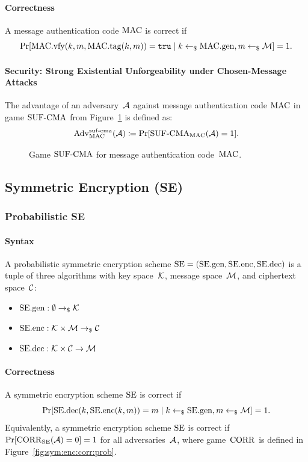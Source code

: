 \documentclass[a4paper,orivec]{llncs}
\begin{document}
\paragraph{Correctness}
A message authentication code $\mathrm{MAC}$ is correct if
\[
\Pr[\mathrm{MAC}.\mathrm{vfy}(k,m,\mathrm{MAC}.\mathrm{tag}(k,m))=\mathtt{tru}\mid k\gets_\$\mathrm{MAC}.\mathrm{gen},m\gets_\$\mathcal{M}]=1\text{.}
\]

\paragraph{Security: Strong Existential Unforgeability under Chosen-Message Attacks}
The advantage of an adversary~$\mathcal{A}$ against message authentication code $\mathrm{MAC}$ in game ${\mathrm{SUF}\text{-}\mathrm{CMA}}$ from Figure~\ref{fig:mac:suf} is defined as:
\[
\mathrm{Adv}_{\mathrm{MAC}}^{\mathrm{suf}\text{-}\mathrm{cma}}(\mathcal{A})\coloneqq\Pr[{\mathrm{SUF}\text{-}\mathrm{CMA}}_{\mathrm{MAC}}(\mathcal{A})=1]\text{.}
\]

\begin{figure}[!ht]
    \centering
    \nicoresetlinenr%
    \fbox{%
        \scalebox{\codescalefactor}{%
        }%
    }
    \caption{%
        Game ${\mathrm{SUF}\text{-}\mathrm{CMA}}$ for message authentication code~$\mathrm{MAC}$.
    }
    \label{fig:mac:suf}
\end{figure}


\subsection{Symmetric Encryption (SE)}

\subsubsection{Probabilistic SE}

\paragraph{Syntax}
A probabilistic symmetric encryption scheme $\mathrm{SE}=(\mathrm{SE}.\mathrm{gen},\mathrm{SE}.\mathrm{enc},\mathrm{SE}.\mathrm{dec})$ is a tuple of three algorithms with key space~$\mathcal{K}$, message space~$\mathcal{M}$, and ciphertext space~$\mathcal{C}$:

\begin{itemize}
    \item $\mathrm{SE}.\mathrm{gen}: \emptyset \to_\$ \mathcal{K}$
    \item $\mathrm{SE}.\mathrm{enc}: \mathcal{K}\times\mathcal{M} \to_\$ \mathcal{C}$
    \item $\mathrm{SE}.\mathrm{dec}: \mathcal{K}\times\mathcal{C} \to \mathcal{M}$
\end{itemize}

\paragraph{Correctness}
A symmetric encryption scheme $\mathrm{SE}$ is correct if 
\[
\Pr[\mathrm{SE}.\mathrm{dec}(k,\mathrm{SE}.\mathrm{enc}(k,m))=m\mid k\gets_\$\mathrm{SE}.\mathrm{gen},m\gets_\$\mathcal{M}]=1\text{.}
\]
Equivalently, a symmetric encryption scheme $\mathrm{SE}$ is correct if $\Pr[\mathrm{CORR}_{\mathrm{SE}}(\mathcal{A})=0]=1$ for all adversaries~$\mathcal{A}$, where game~$\mathrm{CORR}$ is defined in Figure~\ref{fig:sym:enc:corr:prob}.
\end{document}
